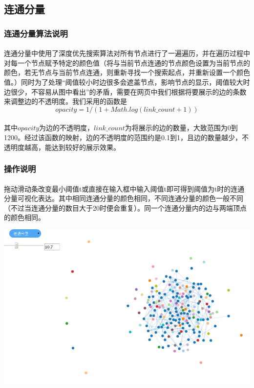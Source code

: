 \documentclass{article}
\begin{document}
\begin{CJK}{UTF8}{gkai}
	\subsection{连通分量}
		\subsubsection{连通分量算法说明} %
			\paragraph{}
			连通分量中使用了深度优先搜索算法对所有节点进行了一遍遍历，并在遍历过程中对每一个节点赋予特定的颜色值（将与当前节点连通的节点颜色设置为当前节点的颜色，若无节点与当前节点连通，则重新寻找一个搜索起点，并重新设置一个颜色值。）同时为了处理“阈值较小时边很多会遮盖节点，影响节点的显示，阈值较大时边很少，不容易从图中看出”的矛盾，需要在网页中我们根据将要展示的边的条数来调整边的不透明度。我们采用的函数是
			 $$opacity = 1 / (1 + Math.log(link\_count + 1))$$
			\paragraph{}
			 其中$opacity$为边的不透明度，$link\_count$为将展示的边的数量，大致范围为0到1200。经过该函数的映射，边的不透明度的范围约是0.1到1，且边的数量越少，不透明度越高，能达到较好的展示效果。
		\subsubsection{操作说明} %
			\paragraph{}
			拖动滑动条改变最小阈值t或直接在输入框中输入阈值t即可得到阈值为t时的连通分量可视化表达。其中相同连通分量的颜色相同，不同连通分量的颜色一般不同（不过当连通分量的数目大于20时便会重复）。同一个连通分量内的边与两端顶点的颜色相同。
		\\[\intextsep] 
		\begin{minipage}{\textwidth} 
		    \centering 
		    \includegraphics[width=0.9\linewidth]{connected_component.PNG}
		\end{minipage} 
		\\[\intextsep] 		


\end{CJK}
\end{document}
